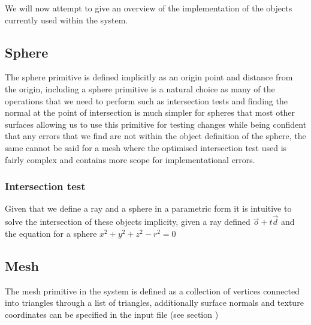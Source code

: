 We will now attempt to give an overview of the implementation of the objects currently used within the system.

\subsection{Sphere}
The sphere primitive is defined implicitly as an origin point and distance from the origin, including a sphere primitive is
a natural choice as many of the operations that we need to perform such as intersection tests and finding the normal at the
point of intersection is much simpler for spheres that most other surfaces allowing us to use this primitive for testing
changes while being confident that any errors that we find are not within the object definition of the sphere, the same cannot
be said for a mesh where the optimised intersection test used is fairly complex and contains more scope for implementational errors.

\subsubsection{Intersection test}
Given that we define a ray and a sphere in a parametric form it is intuitive to solve the intersection of these objects implicity,
given a ray defined $\vec{o} + t \vec{d}$ and the equation for a sphere $x ^ 2 + y ^ 2 + z ^ 2 - r ^ 2 = 0$

\subsection{Mesh}
The mesh primitive in the system is defined as a collection of vertices connected into triangles through a list of triangles,
additionally surface normals and texture coordinates can be specified in the input file (see section )

